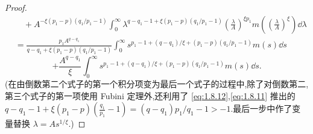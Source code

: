 \begin{proof}
\begin{align*}
&\quad + A^{-\xi(p_{1}-p)(q_{1}/p_{1}-1)}\displaystyle\int_{0}^{\infty}\lambda^{q-q_{1}-1+\xi(p_{1}-p)(q_{1}/p_{1}-1)}\left(\frac{\lambda}{A}\right)^{\xi p_{1}}m\left(\left(\frac{\lambda}{A}\right)^{\xi}\right)\dd \lambda \\
&= \frac{p_{1}A^{q-q_{1}}}{q - q_{1} + \xi(p_{1}-p)(q_{1}/p_{1}-1)}\displaystyle\int_{0}^{\infty}s^{p_{1}-1+(q-q_{1})/\xi+(p_{1}-p)(q_{1}/p_{1}-1)}m(s)\dd s
\end{align*}
\begin{equation*}
+ \frac{A^{q-q_{1}}}{\xi}\int_{0}^{\infty}s^{p_{1}-1+(q-q_{1})/\xi+(p_{1}-p)(q_{1}/p_{1}-1)}m(s)\dd s.
\end{equation*}
(在由倒数第二个式子的第一个积分项变为最后一个式子的过程中,除了对倒数第二,第三个式子的第一项使用 Fubini 定理外,还利用了 \eqref{eq:1.8.12},\eqref{eq:1.8.11} 推出的 $q - q_{1} - 1 + \xi(p_{1}-p)\left(\frac{q_{1}}{p_{1}}-1\right) = (q-q_{1})p_{1}/q_{1} - 1 > -1$.最后一步中作了变量替换 $\lambda = As^{1/\xi}$.)


\end{proof}

